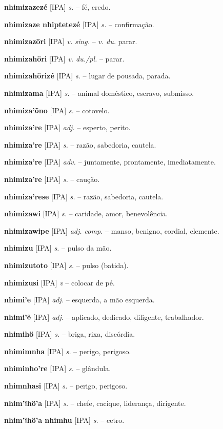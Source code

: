\textbf{nhimizazezé} [IPA] \textit{s.} -- fé, credo.

\textbf{nhimizaze nhiptetezé} [IPA] \textit{s.} -- confirmação.

\textbf{nhimizazöri} [IPA] \textit{v. sing.} -- \textit{v. du.} parar.

\textbf{nhimizahöri} [IPA] \textit{v. du./pl.} -- parar.

\textbf{nhimizahörizé} [IPA] \textit{s.} -- lugar de pousada, parada.

\textbf{nhimizama} [IPA] \textit{s.} -- animal doméstico, escravo, submisso.

\textbf{nhimiza'õno} [IPA] \textit{s.} -- cotovelo.

\textbf{nhimiza're} [IPA] \textit{adj.} -- esperto, perito.

\textbf{nhimiza're} [IPA] \textit{s.} -- razão, sabedoria, cautela.

\textbf{nhimiza're} [IPA] \textit{adv.} -- juntamente, prontamente, imediatamente.

\textbf{nhimiza're} [IPA] \textit{s.} -- caução.

\textbf{nhimiza'rese} [IPA] \textit{s.} -- razão, sabedoria, cautela.

\textbf{nhimizawi} [IPA] \textit{s.} -- caridade, amor, benevolência.

\textbf{nhimizawipe} [IPA] \textit{adj. comp.} -- manso, benigno, cordial, clemente.

\textbf{nhimizu} [IPA] \textit{s.} -- pulso da mão.

\textbf{nhimizutoto} [IPA] \textit{s.} -- pulso (batida).

\textbf{nhimizusi} [IPA] \textit{v} -- colocar de pé.

\textbf{nhimi'e} [IPA] \textit{adj.} -- esquerda, a mão esquerda.

\textbf{nhimi'ẽ} [IPA] \textit{adj.} -- aplicado, dedicado, diligente, trabalhador.

\textbf{nhimihö} [IPA] \textit{s.} -- briga, rixa, discórdia.

\textbf{nhimimnha} [IPA] \textit{s.} -- perigo, perigoso.

\textbf{nhiminho're} [IPA] \textit{s.} -- glândula.

\textbf{nhimnhasi} [IPA] \textit{s.} -- perigo, perigoso.

\textbf{nhim'ĩhö'a} [IPA] \textit{s.} -- chefe, cacique, liderança, dirigente.

\textbf{nhim'ĩhö'a nhimhu} [IPA] \textit{s.} -- cetro.

